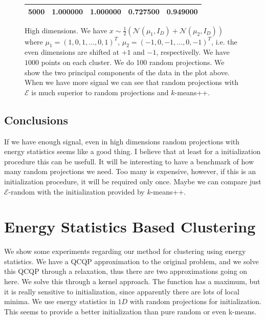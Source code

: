 \documentclass[aps,preprint,nofootinbib,floatfix]{revtex4-1}
\begin{document}
\begin{figure}
\begin{minipage}{.5\textwidth}
\begin{tabular}{l l l l l}
5000 & 1.000000 & 1.000000 & 0.727500 & 0.949000 \\
%
\hline
\end{tabular}
\end{minipage}
\caption{\label{fig:highd}
High dimensions.
We have $x \sim \tfrac{1}{2}\left( \mathcal{N}(\mu_1, I_D) +
\mathcal{N}(\mu_2, I_D)\right)$ where 
$\mu_1 = (1,0,1,\dotsc,0,1)^T$,
$\mu_2 = (-1,0,-1,\dotsc,0,-1)^T$, i.e. the even dimensions are
shifted at $+1$ and $-1$, respectivelly.
We have $1000$ points on each cluster. We do 100 random projections.
We show the two principal components
of the data in the plot above. When we have more signal we can see that
random projections with $\mathcal{E}$ is much superior to random projections
and $k$-means++.
}
\end{figure}


\subsection{Conclusions}
If we have enough signal, even in high dimensions random projections with
energy statistics seems like a good thing. I believe that at least for
a initialization procedure this can be usefull. It will be interesting to
have a benchmark of how many random projections we need. Too many is expensive,
however, if this is an initialization procedure, it will be required only
once. Maybe we can compare just $\mathcal{E}$-random with the initialization
provided by $k$-means++.


\section{Energy Statistics Based Clustering}


We show some experiments regarding our method for clustering using energy
statistics. We have a QCQP approximation to the original problem, and we solve
this QCQP through a relaxation, thus there are two approximations going on
here. We solve this through a kernel approach. The function has a maximum, but
it is really sensitive to initialization, since apparently there are lots of
local minima. We use energy statistics in $1D$ with random projections for
initialization. This seems to provide a better initialization than pure random
or even k-means.
\end{document}
